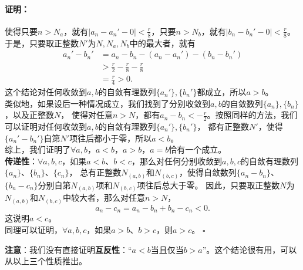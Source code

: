 \documentclass[12pt,UTF8]{ctexbook}
\renewenvironment{proof}{\paragraph{\textbf{证明：}}}{\hfill$\square$}
\begin{document}
\begin{appendix}
\begin{proof}
    使得只要$n>N_a$，就有$|a_n - a_n' - 0| < \frac{r}{8}$，只要$n>N_b$，就有$|b_n - b_n' - 0| < \frac{r}{8}$。
    于是，只要取正整数$N'$为$N,N_a,N_b$中的最大者，就有
    \begin{align*}
        a_n' - b_n' &= a_n - b_n - (a_n - a_n') - (b_n - b_n')  \\
        &> \frac{r}{2} - \frac{r}{8} - \frac{r}{8}  \\
        &= \frac{r}{4} > 0. 
    \end{align*}
    这个结论对任何收敛到$a,b$的自敛有理数列$\{a_n'\}, \{b_n'\}$都成立，所以$a>b$。\\
    类似地，如果设后一种情况成立，我们找到了分别收敛到$a,b$的自敛数列$\{a_n\}, \{b_n\}$，以及正整数$N$，
    使得对任意$n>N$，都有$a_n - b_n < -\frac{r}{2}$。按照同样的方法，我们可以证明对任何收敛到$a,b$的自敛有理数列$\{a_n'\}, \{b_n'\}$，
    都有正整数$N'$，使得$\{a_n' - b_n'\}$自第$N'$项往后都小于零，所以$a<b$。\\
    综上，我们证明了$\forall a, b$，$a < b$，$a > b$，$a = b$恰有一个成立。\\
    \textbf{传递性}：$\forall a, b, c$，如果$a < b$、$b < c$，那么对任何分别收敛到$a,b,c$的自敛有理数列$\{a_n\}$、$\{b_n\}$、$\{c_n\}$，
    总有正整数$N_{(a,b)}$和$N_{(b,c)}$，使得自敛数列$\{a_n - b_n\}$、$\{b_n - c_n\}$分别自第$N_{(a,b)}$项和$N_{(b,c)}$项往后总大于零。
    因此，只要取正整数$N$为$N_{(a,b)}$和$N_{(b,c)}$中较大者，那么对任意$n>N$，
    $$ a_n - c_n = a_n - b_n + b_n - c_n < 0.$$
    这说明$a<c$。\\
    同理可以证明，$\forall a, b, c$，如果$a > b$、$b > c$，则$a > c$。
\end{proof}

\textbf{注意}：我们没有直接证明\textbf{互反性}：“$a<b$当且仅当$b>a$”。这个结论很有用，可以从以上三个性质推出。


\end{appendix}
\end{document}

